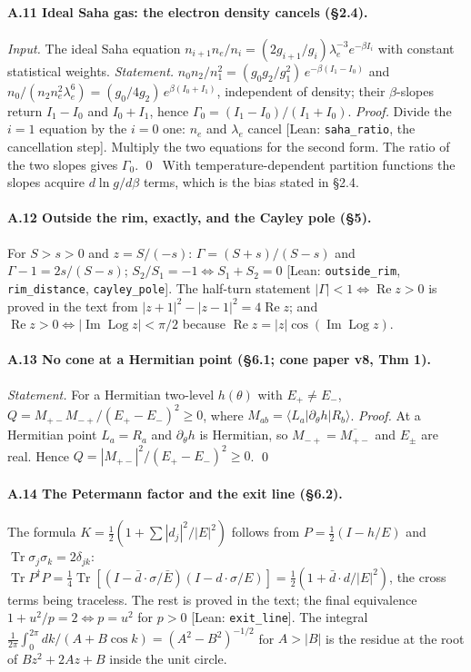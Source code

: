 \documentclass[11pt]{article}
\theoremstyle{definition}
\newcommand{\Tr}{\operatorname{Tr}}
\begin{document}
\paragraph{A.11 Ideal Saha gas: the electron density cancels (§2.4).}
\emph{Input.} The ideal Saha equation $n_{i+1}n_e/n_i=(2g_{i+1}/g_i)\lambda_e^{-3}e^{-\beta I_i}$ with constant statistical weights.
\emph{Statement.} $n_0n_2/n_1^2=(g_0g_2/g_1^2)\,e^{-\beta(I_1-I_0)}$ and $n_0/(n_2n_e^2\lambda_e^6)=(g_0/4g_2)\,e^{\beta(I_0+I_1)}$, independent of density; their $\beta$-slopes return $I_1-I_0$ and $I_0+I_1$, hence $\Gamma_0=(I_1-I_0)/(I_1+I_0)$.
\emph{Proof.} Divide the $i=1$ equation by the $i=0$ one: $n_e$ and $\lambda_e$ cancel \textsf{[Lean: \texttt{saha\_ratio}, the cancellation step]}. Multiply the two equations for the second form. The ratio of the two slopes gives $\Gamma_0$. \qed\ With temperature-dependent partition functions the slopes acquire $d\ln g/d\beta$ terms, which is the bias stated in §2.4.

\paragraph{A.12 Outside the rim, exactly, and the Cayley pole (§5).}
For $S>s>0$ and $z=S/(-s)$: $\Gamma=(S+s)/(S-s)$ and $\Gamma-1=2s/(S-s)$; $S_2/S_1=-1\iff S_1+S_2=0$ \textsf{[Lean: \texttt{outside\_rim}, \texttt{rim\_distance}, \texttt{cayley\_pole}]}. The half-turn statement $|\Gamma|<1\iff\operatorname{Re}z>0$ is proved in the text from $|z+1|^2-|z-1|^2=4\operatorname{Re}z$; and $\operatorname{Re}z>0\iff|\operatorname{Im}\operatorname{Log}z|<\pi/2$ because $\operatorname{Re}z=|z|\cos(\operatorname{Im}\operatorname{Log}z)$.

\paragraph{A.13 No cone at a Hermitian point (§6.1; cone paper v8, Thm 1).}
\emph{Statement.} For a Hermitian two-level $h(\theta)$ with $E_+\ne E_-$, $Q=M_{+-}M_{-+}/(E_+-E_-)^2\ge0$, where $M_{ab}=\langle L_a|\partial_\theta h|R_b\rangle$.
\emph{Proof.} At a Hermitian point $L_a=R_a$ and $\partial_\theta h$ is Hermitian, so $M_{-+}=\overline{M_{+-}}$ and $E_\pm$ are real. Hence $Q=|M_{+-}|^2/(E_+-E_-)^2\ge0$. \qed

\paragraph{A.14 The Petermann factor and the exit line (§6.2).}
The formula $K=\tfrac12(1+\sum|d_j|^2/|E|^2)$ follows from $P=\tfrac12(I-h/E)$ and $\Tr\sigma_j\sigma_k=2\delta_{jk}$: $\Tr P^\dagger P=\tfrac14\Tr[(I-\bar d\cdot\sigma/\bar E)(I-d\cdot\sigma/E)]=\tfrac12(1+\bar d\cdot d/|E|^2)$, the cross terms being traceless. The rest is proved in the text; the final equivalence $1+u^2/p=2\iff p=u^2$ for $p>0$ \textsf{[Lean: \texttt{exit\_line}]}. The integral $\frac1{2\pi}\int_0^{2\pi}dk/(A+B\cos k)=(A^2-B^2)^{-1/2}$ for $A>|B|$ is the residue at the root of $Bz^2+2Az+B$ inside the unit circle.
\end{document}
